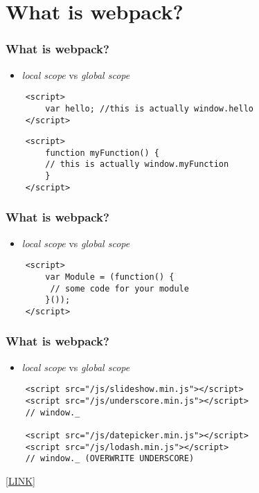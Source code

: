 \section{What is webpack?}

\frame{\tableofcontents[currentsection]}

\begin{frame}[fragile]
    \frametitle{What is webpack?}
    \begin{itemize}
        \item \textit{local scope} vs \textit{global scope}
    \end{itemize}
    \begin{verbatim}
    <script>
        var hello; //this is actually window.hello
    </script>
    \end{verbatim}
        \begin{verbatim}
    <script>
        function myFunction() { 
        // this is actually window.myFunction
        }
    </script>
    \end{verbatim}
\end{frame}

\begin{frame}[fragile]
    \frametitle{What is webpack?}
    \begin{itemize}
        \item \textit{local scope} vs \textit{global scope}
    \end{itemize}
        \begin{verbatim}
    <script>﻿
        var Module = (function() {
         // some code for your module
        }());
    </script>﻿
    \end{verbatim}
\end{frame}

\begin{frame}[fragile]
    \frametitle{What is webpack?}
    \begin{itemize}
        \item \textit{local scope} vs \textit{global scope}
    \end{itemize}
    \begin{verbatim}
    <script src="/js/slideshow.min.js"></script>
    <script src="/js/underscore.min.js"></script>
    // window._
        
    <script src="/js/datepicker.min.js"></script>
    <script src="/js/lodash.min.js"></script> 
    // window._ (OVERWRITE UNDERSCORE)
    \end{verbatim}
    \href{https://blog.jakoblind.no/whats-the-advantage-with-webpack/}{[LINK]}
\end{frame}

